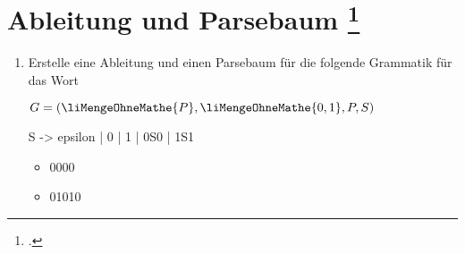 \documentclass{lehramt-informatik-aufgabe}
\begin{document}
\let\m=\liMengeOhneMathe

\section{Ableitung und Parsebaum
\footcite[Seite 18]{theo:fs:2}}

\begin{enumerate}

%

\item Erstelle eine Ableitung und einen Parsebaum für die folgende
Grammatik für das Wort

$G = (\m{P}, \m{0, 1}, P, S)$

\begin{liProduktionsRegeln}
S -> epsilon | 0 | 1 | 0S0 | 1S1
\end{liProduktionsRegeln}

\begin{itemize}

%

\item 0000

\begin{liAntwort}

\begin{center}
\end{center}
\end{liAntwort}

%

\item 01010

\begin{liAntwort}

\begin{center}
\end{center}
\end{liAntwort}
\end{itemize}


\end{enumerate}
\end{document}
